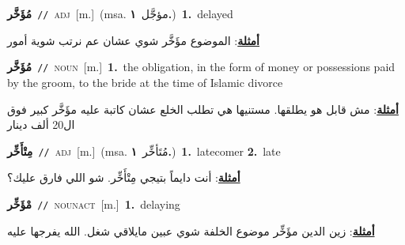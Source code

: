 \documentclass[10pt,a4paper,twoside]{article} %
\begin{document}
\begin{multicols}{2}
{\setlength\topsep{0pt}\textbf{\foreignlanguage{arabic}{مُؤَخَّر}}\ {\color{gray}\texttt{//}\color{black}}\ \textsc{adj}\ [m.]\ \color{gray}(msa. \foreignlanguage{arabic}{مؤجَّل}~\foreignlanguage{arabic}{\textbf{١.}})\color{black}\ \textbf{1.}~delayed\  \begin{flushright}\color{gray}\foreignlanguage{arabic}{\textbf{\underline{\foreignlanguage{arabic}{أمثلة}}}: الموضوع مؤَخَّر شوي عشان عم نرتب شوية أمور}\end{flushright}\color{black}} \vspace{2mm}

{\setlength\topsep{0pt}\textbf{\foreignlanguage{arabic}{مُؤَخَّر}}\ {\color{gray}\texttt{//}\color{black}}\ \textsc{noun}\ [m.]\ \textbf{1.}~the obligation, in the form of money or possessions paid by the groom, to the bride at the time of Islamic divorce\  \begin{flushright}\color{gray}\foreignlanguage{arabic}{\textbf{\underline{\foreignlanguage{arabic}{أمثلة}}}: مش قابل هو يطلقها. مستنيها هي تطلب الخلع عشان كاتبة عليه مؤَخَّر كبير فوق ال20 ألف دينار}\end{flushright}\color{black}} \vspace{2mm}

{\setlength\topsep{0pt}\textbf{\foreignlanguage{arabic}{مِتْأَخِّر}}\ {\color{gray}\texttt{//}\color{black}}\ \textsc{adj}\ [m.]\ \color{gray}(msa. \foreignlanguage{arabic}{مُتَأخِّر}~\foreignlanguage{arabic}{\textbf{١.}})\color{black}\ \textbf{1.}~latecomer  \textbf{2.}~late\  \begin{flushright}\color{gray}\foreignlanguage{arabic}{\textbf{\underline{\foreignlanguage{arabic}{أمثلة}}}: أنت دايماً بتيجي مِتْأَخِّر. شو اللي فارق عليك؟}\end{flushright}\color{black}} \vspace{2mm}

{\setlength\topsep{0pt}\textbf{\foreignlanguage{arabic}{مْؤَخِّر}}\ {\color{gray}\texttt{//}\color{black}}\ \textsc{noun\textunderscore act}\ [m.]\ \textbf{1.}~delaying\  \begin{flushright}\color{gray}\foreignlanguage{arabic}{\textbf{\underline{\foreignlanguage{arabic}{أمثلة}}}: زين الدين مؤَخِّر موضوع الخلفة شوي عبين مايلاقي شغل. الله يفرجها عليه}\end{flushright}\color{black}} \vspace{2mm}


\end{multicols}
\end{document}

